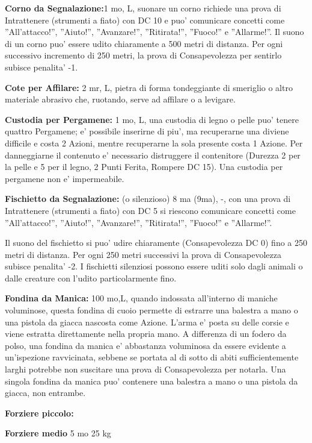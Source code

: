 \documentclass[a4paper,11pt,twoside,openany]{book}
\begin{document}
{		\textbf{Corno da Segnalazione:}1 mo, L, suonare un corno richiede una prova di Intrattenere (strumenti a fiato) con DC 10 e puo' comunicare concetti come ''All'attacco!'', ''Aiuto!'', ''Avanzare!'', ''Ritirata!'', ''Fuoco!'' e ''Allarme!''. Il suono di un corno puo' essere udito chiaramente a 500 metri di distanza. Per ogni successivo incremento di 250 metri, la prova di Consapevolezza per sentirlo subisce penalita' -1.
		
		\textbf{Cote per Affilare:} 2 mr, L, pietra di forma tondeggiante di smeriglio o altro materiale abrasivo che, ruotando, serve ad affilare o a levigare.
		
		\textbf{Custodia per Pergamene:} 1 mo, L, una custodia di legno o pelle puo' tenere quattro Pergamene; e' possibile inserirne di piu', ma recuperarne una diviene difficile e costa 2 Azioni, mentre recuperarne la sola presente costa 1 Azione. Per danneggiarne il contenuto e' necessario distruggere il contenitore (Durezza 2 per la pelle e 5 per il legno, 2 Punti Ferita, Rompere DC 15). Una custodia per pergamene non e' impermeabile.
		
		\textbf{Fischietto da Segnalazione:} (o silenzioso) 8 ma (9ma), -, con una prova di Intrattenere (strumenti a fiato) con DC 5 si riescono comunicare concetti come ''All'attacco!'', ''Aiuto!'', ''Avanzare!'', ''Ritirata!'', ''Fuoco!'' e ''Allarme!''.
		
		Il suono del fischietto si puo' udire chiaramente (Consapevolezza DC 0) fino a 250 metri di distanza. Per ogni 250 metri successivi la prova di Consapevolezza subisce penalita' -2. I fischietti silenziosi possono essere uditi solo dagli animali o dalle creature con l'udito particolarmente fino.
		
		\textbf{Fondina da Manica:} 100 mo,L, quando indossata all'interno di maniche voluminose, questa fondina di cuoio permette di estrarre una balestra a mano o una pistola da giacca nascosta come Azione. L'arma e' posta su delle corsie e viene estratta direttamente nella propria mano.
		A differenza di un fodero da polso, una fondina da manica e' abbastanza voluminosa da essere evidente a un'ispezione ravvicinata, sebbene se portata al di sotto di abiti sufficientemente larghi potrebbe non suscitare una prova di Consapevolezza per notarla. Una singola fondina da manica puo' contenere una balestra a mano o una pistola da giacca, non entrambe.
		
		\textbf{Forziere piccolo:}
		
		\textbf{Forziere medio} 5 mo 25 kg
		
}
\end{document}
